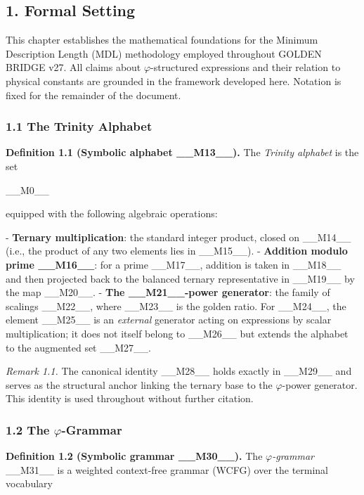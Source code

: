 
\subsection{1. Formal Setting}

This chapter establishes the mathematical foundations for the Minimum Description Length (MDL) methodology employed throughout GOLDEN BRIDGE v27. All claims about $\varphi$-structured expressions and their relation to physical constants are grounded in the framework developed here. Notation is fixed for the remainder of the document.

\subsubsection{1.1 The Trinity Alphabet}

\textbf{Definition 1.1 (Symbolic alphabet \_\_M13\_\_).} The \textit{Trinity alphabet} is the set

\_\_M0\_\_

equipped with the following algebraic operations:

- \textbf{Ternary multiplication}: the standard integer product, closed on \_\_M14\_\_ (i.e., the product of any two elements lies in \_\_M15\_\_).
- \textbf{Addition modulo prime \_\_M16\_\_}: for a prime \_\_M17\_\_, addition is taken in \_\_M18\_\_ and then projected back to the balanced ternary representative in \_\_M19\_\_ by the map \_\_M20\_\_.
- \textbf{The \_\_M21\_\_-power generator}: the family of scalings \_\_M22\_\_, where \_\_M23\_\_ is the golden ratio. For \_\_M24\_\_, the element \_\_M25\_\_ is an \textit{external} generator acting on expressions by scalar multiplication; it does not itself belong to \_\_M26\_\_ but extends the alphabet to the augmented set \_\_M27\_\_.

\textit{Remark 1.1.} The canonical identity \_\_M28\_\_ holds exactly in \_\_M29\_\_ and serves as the structural anchor linking the ternary base to the $\varphi$-power generator. This identity is used throughout without further citation.

\subsubsection{1.2 The $\varphi$-Grammar}

\textbf{Definition 1.2 (Symbolic grammar \_\_M30\_\_).} The \textit{$\varphi$-grammar} \_\_M31\_\_ is a weighted context-free grammar (WCFG) over the terminal vocabulary

